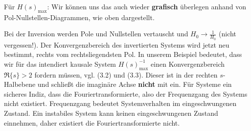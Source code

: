 
\begin{ExCalc}
Für $H(s)_\mathrm{max}$: Wir können uns das auch wieder \textbf{grafisch}
überlegen anhand von Pol-Nullstellen-Diagrammen, wie oben dargestellt.

Bei der Inversion werden Pole und Nullstellen vertauscht und $H_0\rightarrow \frac{1}{H_0}$
(nicht vergessen!).
Der Konvergenzbereich des invertierten Systems wird jetzt neu bestimmt, rechts
vom rechtsliegendsten Pol.
In unserem Beispiel bedeutet, dass wir für das intendiert kausale
System $H(s)_\mathrm{max}^{-1}$ einen Konvergenzbereich $\Re\{s\}>2$ fordern
müssen, vgl.  (3.2) und  (3.3).
Dieser ist in der rechten $s$-Halbebene und schließt die imaginäre Achse
\textbf{nicht} mit ein. Für Systeme ein sicheres Indiz, dass die
Fouriertransformierte, also der Frequenzgang des Systems nicht existiert.
Frequenzgang bedeutet Systemverhalten im eingeschwungenen Zustand. Ein instabiles
System kann keinen eingeschwungenen Zustand einnehmen, daher existiert die
Fouriertransformierte nicht.


\end{ExCalc}



